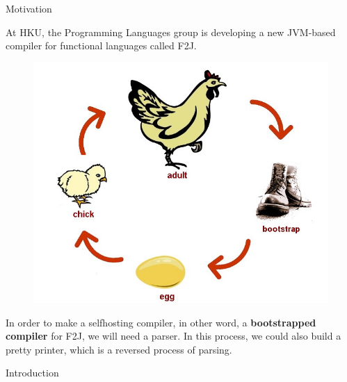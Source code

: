 \documentclass[final]{beamer}
\newlength{\onecolwid}
\begin{document}
\begin{frame}[t]
\begin{columns}[t]
\begin{column}{\onecolwid}
\begin{figure}
\end{figure}


\begin{block}{Motivation}

At HKU, the Programming Languages group is developing a new JVM-based compiler for functional languages called F2J. 

\begin{figure}
\includegraphics[width=0.9\linewidth]{img/bootstrapping.jpg}

\end{figure}

In order to make a selfhosting compiler, in other word, a \textbf{bootstrapped compiler} for F2J, we will need a parser. In this process, we could also build a pretty printer, which is a reversed process of parsing.

\end{block}

\begin{block}{Introduction}



\end{block}
\end{column}
\end{columns}
\end{frame}
\end{document}
